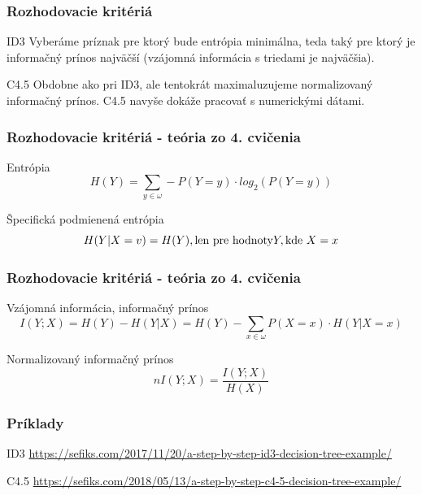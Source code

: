 \documentclass{beamer}
\begin{document}
\begin{frame}
\frametitle{Rozhodovacie kritériá}

\begin{block}{ID3}
Vyberáme príznak pre ktorý bude entrópia minimálna, teda taký pre ktorý je informačný prínos najväčší (vzájomná informácia s triedami je najväčšia).
\end{block}

\begin{block}{C4.5}
Obdobne ako pri ID3, ale tentokrát maximaluzujeme normalizovaný informačný prínos. C4.5 navyše dokáže pracovať s numerickými dátami.
\end{block}
\end{frame}


\begin{frame}
\frametitle{Rozhodovacie kritériá - teória zo 4. cvičenia}

\begin{block}{Entrópia}
$$H(Y) = \sum_{y \in \omega} - P(Y = y) \cdot log_2(P(Y=y))$$
\end{block}

\begin{block}{Špecifická podmienená entrópia}
$$H(Y| X = v) = H(Y), \textnormal{len pre hodnoty} Y, \textnormal{kde } X = x $$
\end{block}
\end{frame}


\begin{frame}
\frametitle{Rozhodovacie kritériá - teória zo 4. cvičenia}
\begin{block}{Vzájomná informácia, informačný prínos}
$$I(Y;X) = H(Y) - H(Y|X) = H(Y) - \sum_{x \in \omega} P(X = x)\cdot H(Y|X = x)$$
\end{block}

\begin{block}{Normalizovaný informačný prínos}
$$nI(Y;X) = \frac{I(Y;X)}{H(X)}$$
\end{block}
\end{frame}


\begin{frame}
\frametitle{Príklady}

\begin{block}{ID3}
\url{https://sefiks.com/2017/11/20/a-step-by-step-id3-decision-tree-example/}
\end{block}

\begin{block}{C4.5}
\url{https://sefiks.com/2018/05/13/a-step-by-step-c4-5-decision-tree-example/}
\end{block}
\end{frame}
\end{document}
